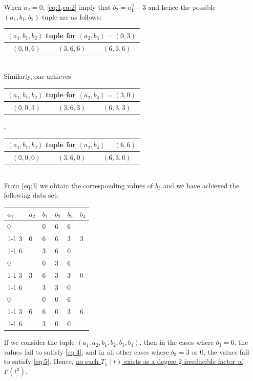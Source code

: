 \documentclass[11pt,twoside]{amsart}
\theoremstyle{definition} %
\begin{document}
When $a_2=0$, \cref{eq:1,eq:2} imply that $b_2=a_1^2-3$ and hence the possible $(a_1,b_1,b_2)$ tuple are as follows:
\begin{table}[h]
\centering

\begin{tabular}{ccc}
\toprule 
\multicolumn{3}{c}{$(a_1, b_1,b_2)$ tuple for $(a_2,b_4)=(0,3)$} \\
\midrule 
$(0, 0,6)$ & $(3, 6,6)$ & $(6,3, 6)$ \\
\bottomrule 
\end{tabular}

\end{table}\\
Similarly, one achieves 
\begin{table}[h]
\centering

\begin{tabular}{ccc}
\toprule 
\multicolumn{3}{c}{$(a_1, b_1,b_2)$ tuple for $(a_2,b_4)=(3,0)$} \\
\midrule 
$(0, 0,3)$ & $(3, 6,3)$ & $(6,3, 3)$ \\
\bottomrule 
\end{tabular},
\begin{tabular}{ccc}
\toprule 
\multicolumn{3}{c}{$(a_1, b_1,b_2)$ tuple for $(a_2,b_4)=(6,6)$} \\
\midrule 
$(0, 0,0)$ & $(3, 6,0)$ & $(6,3, 0)$ \\
\bottomrule 
\end{tabular}

\end{table}\\

From \cref{eq:3} we obtain the corresponding values of $b_3$ and we have achieved the following data set:
\begin{table}[H]
\begin{tabular}{|l|l|l|l|l|l|}
\hline
$a_1$ & $a_2$ & $b_1$ & $b_2$ & $b_3$ & $b_4$ \\ \hline
0    &      & 0    & 6    & 6    &      \\ \cline{1-1} \cline{3-5}
3    & 0    & 6    & 6    & 3    & 3    \\ \cline{1-1} \cline{3-5}
6    &      & 3    & 6    & 0    &      \\ \hline
0    &      & 0    & 3    & 6    &      \\ \cline{1-1} \cline{3-5}
3    & 3    & 6    & 3    & 3    & 0    \\ \cline{1-1} \cline{3-5}
6    &      & 3    & 3    & 0    &      \\ \hline
0    &      & 0    & 0    & 6    &      \\ \cline{1-1} \cline{3-5}
3    & 6    & 6    & 0    & 3    & 6    \\ \cline{1-1} \cline{3-5}
6    &      & 3    & 0    & 0    &      \\ \hline
\end{tabular}
\end{table}
If we consider the tuple $(a_1, a_2, b_1, b_2, b_3, b_4)$, then in the cases where $b_3 = 6$, the values fail to satisfy \cref{eq:4}, and in all other cases where $b_3 = 3$ or $0$, the values fail to satisfy \cref{eq:5}. Hence, \ul{no such $T_1(t)$ exists as a degree $2$ irreducible factor of $F(t^3)$}.
\end{document}
